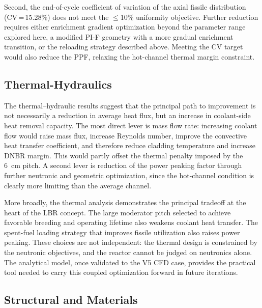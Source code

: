 Second, the end-of-cycle coefficient of variation of the axial fissile
distribution (CV\,=\,15.28\%) does not meet the $\leq$10\% uniformity
objective. Further reduction requires either enrichment gradient optimization
beyond the parameter range explored here, a modified PI-F geometry with a
more gradual enrichment transition, or the reloading strategy described above.
Meeting the CV target would also reduce the PPF, relaxing the hot-channel
thermal margin constraint.

\subsection{Thermal-Hydraulics}


The thermal--hydraulic results suggest that the principal path to improvement is not necessarily a reduction in average heat flux, but an increase in coolant-side heat removal capacity. The most direct lever is mass flow rate: increasing coolant flow would raise mass flux, increase Reynolds number, improve the convective heat transfer coefficient, and therefore reduce cladding temperature and increase DNBR margin. This would partly offset the thermal penalty imposed by the 6~cm pitch. A second lever is reduction of the power peaking factor through further neutronic and geometric optimization, since the hot-channel condition is clearly more limiting than the average channel.

More broadly, the thermal analysis demonstrates the principal tradeoff at the heart of the LBR concept. The large moderator pitch selected to achieve favorable breeding and operating lifetime also weakens coolant heat transfer. The spent-fuel loading strategy that improves fissile utilization also raises power peaking. These choices are not independent: the thermal design is constrained by the neutronic objectives, and the reactor cannot be judged on neutronics alone. The analytical model, once validated to the V5 CFD case, provides the practical tool needed to carry this coupled optimization forward in future iterations.

\subsection{Structural and Materials}

